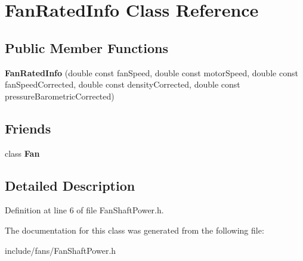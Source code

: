 \hypertarget{class_fan_rated_info}{}\section{Fan\+Rated\+Info Class Reference}
\label{class_fan_rated_info}
\subsection*{Public Member Functions}
\begin{DoxyCompactItemize}
\item 
\mbox{\label{class_fan_rated_info_aa76c95537bd1a0cd0159a8d45df76f18}} 
{\bfseries Fan\+Rated\+Info} (double const fan\+Speed, double const motor\+Speed, double const fan\+Speed\+Corrected, double const density\+Corrected, double const pressure\+Barometric\+Corrected)
\end{DoxyCompactItemize}
\subsection*{Friends}
\begin{DoxyCompactItemize}
\item 
\mbox{\label{class_fan_rated_info_a0a305abd4183ca4b5d3adb1b563378d7}} 
class {\bfseries Fan}
\end{DoxyCompactItemize}


\subsection{Detailed Description}


Definition at line 6 of file Fan\+Shaft\+Power.\+h.



The documentation for this class was generated from the following file\+:\begin{DoxyCompactItemize}
\item 
include/fans/Fan\+Shaft\+Power.\+h\end{DoxyCompactItemize}
